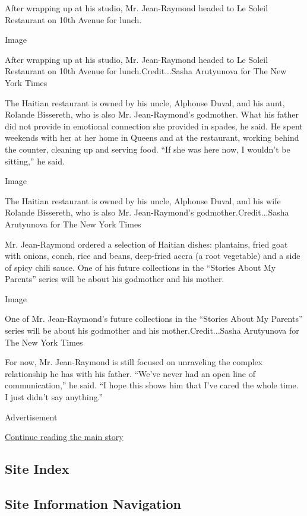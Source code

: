 After wrapping up at his studio, Mr. Jean-Raymond headed to Le Soleil
Restaurant on 10th Avenue for lunch.

Image

After wrapping up at his studio, Mr. Jean-Raymond headed to Le Soleil
Restaurant on 10th Avenue for lunch.Credit...Sasha Arutyunova for The
New York Times

The Haitian restaurant is owned by his uncle, Alphonse Duval, and his
aunt, Rolande Bissereth, who is also Mr. Jean-Raymond's godmother. What
his father did not provide in emotional connection she provided in
spades, he said. He spent weekends with her at her home in Queens and at
the restaurant, working behind the counter, cleaning up and serving
food. ``If she was here now, I wouldn't be sitting,'' he said.

Image

The Haitian restaurant is owned by his uncle, Alphonse Duval, and his
wife Rolande Bissereth, who is also Mr. Jean-Raymond's
godmother.Credit...Sasha Arutyunova for The New York Times

Mr. Jean-Raymond ordered a selection of Haitian dishes: plantains, fried
goat with onions, conch, rice and beans, deep-fried accra (a root
vegetable) and a side of spicy chili sauce. One of his future
collections in the ``Stories About My Parents'' series will be about his
godmother and his mother.

Image

One of Mr. Jean-Raymond's future collections in the ``Stories About My
Parents'' series will be about his godmother and his
mother.Credit...Sasha Arutyunova for The New York Times

For now, Mr. Jean-Raymond is still focused on unraveling the complex
relationship he has with his father. ``We've never had an open line of
communication,'' he said. ``I hope this shows him that I've cared the
whole time. I just didn't say anything.''

Advertisement

\protect\hyperlink{after-bottom}{Continue reading the main story}

\hypertarget{site-index}{%
\subsection{Site Index}\label{site-index}}

\hypertarget{site-information-navigation}{%
\subsection{Site Information
Navigation}\label{site-information-navigation}}

